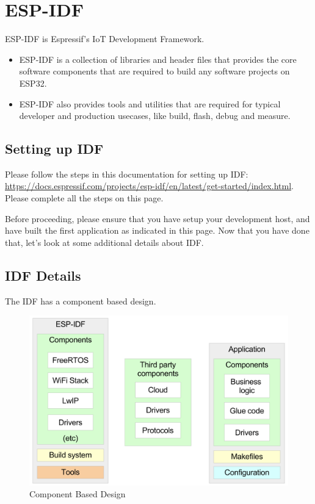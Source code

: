\documentclass[main.tex]{subfiles}
\begin{document}
\section{ESP-IDF}

ESP-IDF is Espressif's IoT Development Framework. 
\begin{itemize}
    \item ESP-IDF is a collection of libraries and header files that provides the core software components that are required to build any software projects on ESP32. 
    \item ESP-IDF also provides tools and utilities that are required for typical developer and production usecases, like build, flash, debug and measure.
\end{itemize}

\subsection{Setting up IDF}

Please follow the steps in this documentation for setting up IDF: \url{https://docs.espressif.com/projects/esp-idf/en/latest/get-started/index.html}. Please complete all the steps on this page.

Before proceeding, please ensure that you have setup your development host, and have built the first application as indicated in this page. Now that you have done that, let's look at some additional details about IDF.

\subsection{IDF Details}

The IDF has a component based design.

\begin{figure}[h!]
    \centering
    \includegraphics[width=\textwidth]{../../_static/idf_comp.png}
    \caption{Component Based Design}
    \label{fig:idf_comp_design}
\end{figure}
\end{document}
